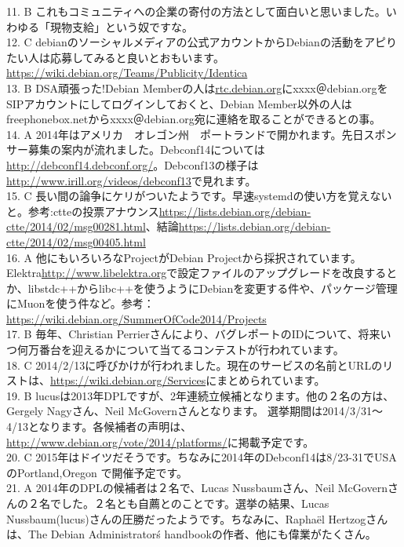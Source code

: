 \documentclass[mingoth,a4paper]{jsarticle}
\begin{document}
{11. B これもコミュニティへの企業の寄付の方法として面白いと思いました。いわゆる「現物支給」という奴ですな。\\
12. C debianのソーシャルメディアの公式アカウントからDebianの活動をアピりたい人は応募してみると良いとおもいます。\url {https://wiki.debian.org/Teams/Publicity/Identica}\\
13. B DSA頑張った!Debian Memberの人は\url {rtc.debian.org}にxxxx＠debian.orgをSIPアカウントにしてログインしておくと、Debian Member以外の人はfreephonebox.netからxxxx＠debian.org宛に連絡を取ることができるとの事。\\
14. A 2014年はアメリカ　オレゴン州　ポートランドで開かれます。先日スポンサー募集の案内が流れました。Debconf14については\url {http://debconf14.debconf.org/}。Debconf13の様子は\url {http://www.irill.org/videos/debconf13}で見れます。\\
15. C 長い間の論争にケリがついたようです。早速systemdの使い方を覚えないと。参考:ctteの投票アナウンス\url {https://lists.debian.org/debian-ctte/2014/02/msg00281.html}、結論\url {https://lists.debian.org/debian-ctte/2014/02/msg00405.html} \\
16. A 他にもいろいろなProjectがDebian Projectから採択されています。Elektra\url {http://www.libelektra.org}で設定ファイルのアップグレードを改良するとか、libstdc++からlibc++を使うようにDebianを変更する件や、パッケージ管理にMuonを使う件など。参考：\url {https://wiki.debian.org/SummerOfCode2014/Projects}\\
17. B 毎年、Christian Perrierさんにより、バグレポートのIDについて、将来いつ何万番台を迎えるかについて当てるコンテストが行われています。\\
18. C 2014/2/13に呼びかけが行われました。現在のサービスの名前とURLのリストは、\url{https://wiki.debian.org/Services}にまとめられています。\\
19. B lucusは2013年DPLですが、2年連続立候補となります。他の２名の方は、Gergely Nagyさん、Neil McGovernさんとなります。 選挙期間は2014/3/31〜4/13となります。各候補者の声明は、\url{http://www.debian.org/vote/2014/platforms/}に掲載予定です。\\
20. C 2015年はドイツだそうです。ちなみに2014年のDebconf14は8/23-31でUSAのPortland,Oregon で開催予定です。 \\
21. A 2014年のDPLの候補者は２名で、Lucas Nussbaumさん、Neil McGovernさんの２名でした。２名とも自薦とのことです。選挙の結果、Lucas Nussbaum(lucus)さんの圧勝だったようです。ちなみに、Rapha\"{e}l Hertzogさんは、The Debian Administrator\'s handbookの作者、他にも偉業がたくさん。\\
}
\end{document}
